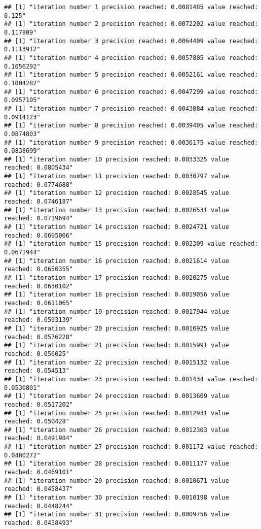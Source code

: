 \documentclass[
]{article}
\begin{document}
\begin{verbatim}
## [1] "iteration number 1 precision reached: 0.0081485 value reached: 0.125"
## [1] "iteration number 2 precision reached: 0.0072202 value reached: 0.117809"
## [1] "iteration number 3 precision reached: 0.0064409 value reached: 0.1113912"
## [1] "iteration number 4 precision reached: 0.0057805 value reached: 0.1056292"
## [1] "iteration number 5 precision reached: 0.0052161 value reached: 0.1004282"
## [1] "iteration number 6 precision reached: 0.0047299 value reached: 0.0957105"
## [1] "iteration number 7 precision reached: 0.0043084 value reached: 0.0914123"
## [1] "iteration number 8 precision reached: 0.0039405 value reached: 0.0874803"
## [1] "iteration number 9 precision reached: 0.0036175 value reached: 0.0838699"
## [1] "iteration number 10 precision reached: 0.0033325 value reached: 0.0805434"
## [1] "iteration number 11 precision reached: 0.0030797 value reached: 0.0774688"
## [1] "iteration number 12 precision reached: 0.0028545 value reached: 0.0746187"
## [1] "iteration number 13 precision reached: 0.0026531 value reached: 0.0719694"
## [1] "iteration number 14 precision reached: 0.0024721 value reached: 0.0695006"
## [1] "iteration number 15 precision reached: 0.002309 value reached: 0.0671944"
## [1] "iteration number 16 precision reached: 0.0021614 value reached: 0.0650355"
## [1] "iteration number 17 precision reached: 0.0020275 value reached: 0.0630102"
## [1] "iteration number 18 precision reached: 0.0019056 value reached: 0.0611065"
## [1] "iteration number 19 precision reached: 0.0017944 value reached: 0.0593139"
## [1] "iteration number 20 precision reached: 0.0016925 value reached: 0.0576228"
## [1] "iteration number 21 precision reached: 0.0015991 value reached: 0.056025"
## [1] "iteration number 22 precision reached: 0.0015132 value reached: 0.054513"
## [1] "iteration number 23 precision reached: 0.001434 value reached: 0.0530801"
## [1] "iteration number 24 precision reached: 0.0013609 value reached: 0.0517202"
## [1] "iteration number 25 precision reached: 0.0012931 value reached: 0.050428"
## [1] "iteration number 26 precision reached: 0.0012303 value reached: 0.0491984"
## [1] "iteration number 27 precision reached: 0.001172 value reached: 0.0480272"
## [1] "iteration number 28 precision reached: 0.0011177 value reached: 0.0469101"
## [1] "iteration number 29 precision reached: 0.0010671 value reached: 0.0458437"
## [1] "iteration number 30 precision reached: 0.0010198 value reached: 0.0448244"
## [1] "iteration number 31 precision reached: 0.0009756 value reached: 0.0438493"

\end{verbatim}
\end{document}
